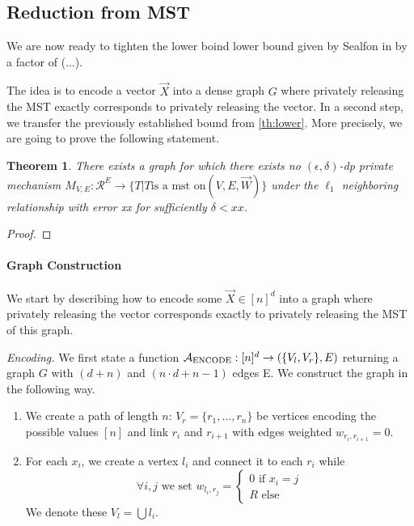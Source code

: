 \documentclass{article}
\newtheorem{theorem}{Theorem}[section]
\begin{document}
\subsection{Reduction from MST}

We are now ready to tighten the lower boind lower bound given by Sealfon in \cite{sealfon_shortest_2016} by a factor of (...).

The idea is to encode a vector $\vec{X}$ into a dense graph $G$ where privately releasing the MST exactly corresponds to privately releasing the vector.
In a second step, we transfer the previously established bound from \cref{th:lower}.
More precisely, we are going to prove the following statement.

\begin{theorem}
There exists a graph for which there exists no $(\epsilon, \delta)$-dp private mechanism $M_{V,E}:\mathcal{R}^E \rightarrow \{T|T \text{is a mst on} (V,E, \vec{W})\}$ under the $\ell_1$ neighboring relationship with error xx for sufficiently  $\delta< xx$.
\end{theorem}
\begin{proof}
\end{proof}


\paragraph{Graph Construction}
We start by describing how to encode some $\vec{X} \in [n]^d$ into a graph where privately releasing the vector corresponds exactly to privately releasing the MST of this graph.

\noindent\textit{Encoding.} We first state a function ${\mathcal{A}_{\mathrm{ENCODE}}:[n]^d \rightarrow (\{V_l,V_r\}, E)}$ returning a graph $G$ with $(d + n)$ and $(n \cdot d + n - 1)$ edges E.
We construct the graph in the following way. 

\begin{enumerate}
    \item We create a path of length $n$: $V_r = \{r_1, ..., r_n\}$ be vertices encoding the possible values $[n]$ and link $r_i$ and $r_{i+1}$ with edges weighted $w_{r_i,r_{i+1}} = 0$.
    \item For each $x_i$, we create a vertex $l_i$ 
    and connect it to each $r_i$ while 
    \[
    \forall i, j \text{~we set~} w_{l_i, r_j} = \begin{cases}
       0 \text{~if~} x_i = j\\
       R \text{~else}
    \end{cases}
    \]
    \noindent We denote these $V_l = \bigcup l_i $.
\end{enumerate}
\end{document}
